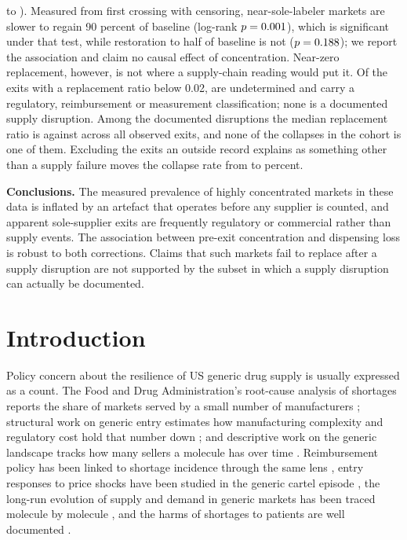 \documentclass[pdflatex,sn-vancouver-num,Numbered]{sn-jnl}
\begin{document}
{to \nCIHi). Measured from first
crossing with censoring, near-sole-labeler markets are slower to regain 90 percent of baseline
(log-rank $p=0.001$), which is significant under that test, while restoration to half
of baseline is not ($p=0.188$); we report the association and claim no causal effect of
concentration. Near-zero replacement, however, is not where a supply-chain reading would put it.
Of the \nNearZeroN exits with a replacement ratio below 0.02, \nNearZeroUndet are undetermined
and \nNearZeroExplained carry a regulatory, reimbursement or measurement classification; none is
a documented supply disruption. Among the \nCauseSupplyW documented disruptions the median
replacement ratio is \nSupplyMedian against \nAllMedian across all \nCauseTotal observed exits,
and none of the \nCollPooledColl collapses in the cohort is one of them. Excluding the exits an
outside record explains as something other than a supply failure moves the collapse rate from
\nCollPooledRate to \nCollRemRate percent.

\textbf{Conclusions.} The measured prevalence of highly concentrated markets in these data is
inflated by an artefact that operates before any supplier is counted, and apparent sole-supplier exits are frequently
regulatory or commercial rather than supply events. The association between pre-exit
concentration and dispensing loss is robust to both corrections. Claims that such markets fail to
replace after a supply disruption are not supported by the subset in which a supply disruption
can actually be documented.}


\maketitle

\section{Introduction}\label{sec:intro}

Policy concern about the resilience of US generic drug supply is usually expressed as a count.
The Food and Drug Administration's root-cause analysis of shortages reports the share of markets
served by a small number of manufacturers \cite{fda2019taskforce}; structural work on generic
entry estimates how manufacturing complexity and regulatory cost hold that number down
\cite{wang2023}; and descriptive work on the generic landscape tracks how many sellers a molecule
has over time \cite{berndt2017,conti2020}. Reimbursement policy has been linked to shortage
incidence through the same lens \cite{yurukoglu2017}, entry responses to price shocks have been
studied in the generic cartel episode \cite{starc2022}, the long-run evolution of supply and
demand in generic markets has been traced molecule by molecule \cite{frank2021}, and the harms of
shortages to patients are well documented \cite{phuong2019,aronson2023}.
\end{document}
